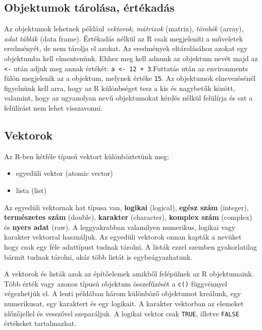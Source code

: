 \documentclass[
]{book}
\providecommand{\tightlist}{%
  \setlength{\itemsep}{0pt}\setlength{\parskip}{0pt}}
\begin{document}
\hypertarget{objektumok-tuxe1roluxe1sa-uxe9rtuxe9kaduxe1s}{%
\subsection{Objektumok tárolása,
értékadás}\label{objektumok-tuxe1roluxe1sa-uxe9rtuxe9kaduxe1s}}

Az objektumok lehetnek például \emph{vektorok}, \emph{mátrixok}
(matrix), \emph{tömbök} (array), \emph{adat táblák} (data frame).
Értékadás nélkül az R csak megjeleníti a műveletek eredményét, de nem
tárolja el azokat. Az eredmények eltárolásához azokat egy objektumba
kell elmentenünk. Ehhez meg kell adnunk az objektum nevét majd az
\texttt{\textless{}-} után adjuk meg annak értékét:
\texttt{a\ \textless{}-\ 12\ +\ 3}.Futtatás után az environments fülön
megjelenik az a objektum, melynek értéke \texttt{15}. Az objektumok
elnevezésénél figyelnünk kell arra, hogy az R különbséget tesz a kis és
nagybetűk között, valamint, hogy az ugyanolyan nevű objektumokat kérdés
nélkül felülírja és ezt a felülírást nem lehet visszavonni.

\hypertarget{vektorok}{%
\subsection{Vektorok}\label{vektorok}}

Az R-ben kétféle típusú vektort különböztetünk meg:

\begin{itemize}
\tightlist
\item
  egyedüli vektor (atomic vector)
\item
  lista (list)
\end{itemize}

Az egyedüli vektornak hat típusa van, \textbf{logikai} (logical),
\textbf{egész szám} (integer), \textbf{természetes szám} (double),
\textbf{karakter} (character), \textbf{komplex szám} (complex) és
\textbf{nyers adat} (raw). A leggyakrabban valamilyen numerikus, logikai
vagy karakter vektorral használjuk. Az egyedüli vektorok onnan kapták a
nevüket hogy csak egy féle adattípust tudnak tárolni. A listák ezzel
szemben gyakorlatilag bármit tudnak tárolni, akár több listát is
egybeágyazhatunk.

A vektorok és listák azok az építőelemek amikből felépülnek az R
objektumaink. Több érték vagy azonos típusú objektum összefűzését a
\texttt{c()} függvénnyel végezhetjük el. A lenti példában három
különböző objektumot kreálunk, egy numerikusat, egy karaktert és egy
logikait. A karakter vektorban az elemeket időzőjellel és vesszővel
szeparáljuk. A logikai vektor csak \texttt{TRUE}, illetve \texttt{FALSE}
értékeket tartalmazhat.
\end{document}
